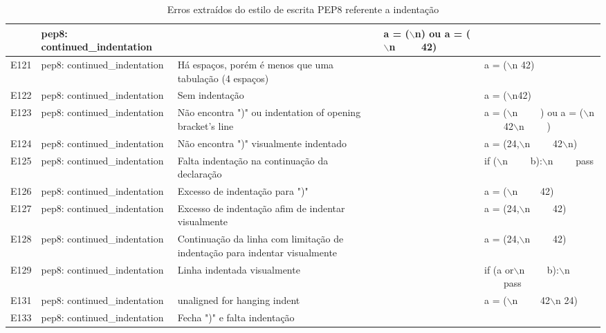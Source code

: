 \begin{landscape}
\begin{table}
\begin{tabularx}{\linewidth}{ |p{1cm}|p{4cm}|p{7cm}|X|X|}
				& pep8: continued\_indentation
				&  
				& a = ($\backslash$n) ou a = ($\backslash$n \ \ \ \ 42)
				&  \\
				\hline
				E121
				& pep8: continued\_indentation
				& Há espaços, porém é menos que uma tabulação (4 espaços)
				&  
				& a = ($\backslash$n   42) \\
				\hline
				E122
				& pep8: continued\_indentation
				& Sem indentação
				&  
				& a = ($\backslash$n42) \\
				\hline
				E123
				& pep8: continued\_indentation
				& Não encontra ")" ou indentation of opening bracket's line
				&  
				& a = ($\backslash$n \ \ \ \ ) ou a = ($\backslash$n \ \ \ \ 42$\backslash$n \ \ \ \ ) \\
				\hline
				E124
				& pep8: continued\_indentation
				& Não encontra ")" visualmente indentado
				&  
				& a = (24,$\backslash$n \ \ \ \  42$\backslash$n) \\
				\hline
				E125
				& pep8: continued\_indentation
				& Falta indentação na continuação da declaração
				&  
				& if ($\backslash$n \ \ \ \ b):$\backslash$n \ \ \ \ pass \\
				\hline
				E126
				& pep8: continued\_indentation
				& Excesso de indentação para ")"
				&  
				& a = ($\backslash$n \ \ \ \ 42) \\
				\hline
				E127
				& pep8: continued\_indentation
				& Excesso de indentação afim de indentar visualmente
				&  
				& a = (24,$\backslash$n \ \ \ \   42) \\
				\hline
				E128
				& pep8: continued\_indentation
				& Continuação da linha com limitação de indentação para indentar visualmente
				&  
				& a = (24,$\backslash$n \ \ \ \ 42) \\
				\hline
				E129
				& pep8: continued\_indentation
				& Linha indentada visualmente
				&  
				& if (a or$\backslash$n \ \ \ \ b):$\backslash$n \ \ \ \ pass \\
				\hline
				E131
				& pep8: continued\_indentation
				& unaligned for hanging indent
				&  
				& a = ($\backslash$n \ \ \ \ 42$\backslash$n 24) \\
				\hline
				E133
				& pep8: continued\_indentation
				& Fecha ")" e falta indentação
				&  
				&  \\
				\hline
			\end{tabularx}
			\captionsetup{justification=centering}
			\caption{Erros extraídos do estilo de escrita PEP8 referente a indentação}
			\label{tab:pep8E100}
		\end{table}
	\end{landscape}
	
